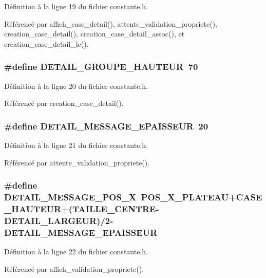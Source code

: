 D\'{e}finition \`{a} la ligne 19 du fichier constante.h.

R\'{e}f\'{e}renc\'{e} par affich\_\-case\_\-detail(), attente\_\-validation\_\-propriete(), creation\_\-case\_\-detail(), creation\_\-case\_\-detail\_\-assoc(), et creation\_\-case\_\-detail\_\-lc().
\subsubsection{\setlength{\rightskip}{0pt plus 5cm}\#define DETAIL\_\-GROUPE\_\-HAUTEUR~70}\label{constante_8h_c03f6e4ed97ee42ec4df81b4ae050a16}




D\'{e}finition \`{a} la ligne 20 du fichier constante.h.

R\'{e}f\'{e}renc\'{e} par creation\_\-case\_\-detail().
\subsubsection{\setlength{\rightskip}{0pt plus 5cm}\#define DETAIL\_\-MESSAGE\_\-EPAISSEUR~20}\label{constante_8h_c7f92050fd2af82687143b46279a6828}




D\'{e}finition \`{a} la ligne 21 du fichier constante.h.

R\'{e}f\'{e}renc\'{e} par attente\_\-validation\_\-propriete().
\subsubsection{\setlength{\rightskip}{0pt plus 5cm}\#define DETAIL\_\-MESSAGE\_\-POS\_\-X~POS\_\-X\_\-PLATEAU+CASE\_\-HAUTEUR+(TAILLE\_\-CENTRE-DETAIL\_\-LARGEUR)/2-DETAIL\_\-MESSAGE\_\-EPAISSEUR}\label{constante_8h_6e9407a1257944148164540dbc2137c3}




D\'{e}finition \`{a} la ligne 22 du fichier constante.h.

R\'{e}f\'{e}renc\'{e} par affich\_\-validation\_\-propriete().
